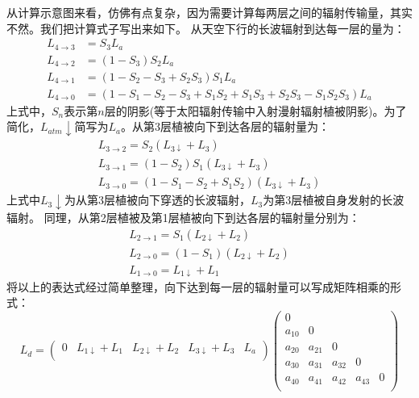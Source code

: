 从计算示意图来看，仿佛有点复杂，因为需要计算每两层之间的辐射传输量，其实不然。我们把计算式子写出来如下。
从天空下行的长波辐射到达每一层的量为：
\begin{equation}
\begin{aligned} L_{4 \rightarrow 3} &=S_{3} L_{a} \\ L_{4 \rightarrow 2} &=\left(1-S_{3}\right) S_{2} L_{a} 
    \\ L_{4 \rightarrow 1} &=\left(1-S_{2}-S_{3}+S_{2} S_{3}\right) S_{1} L_{a} \\ 
    L_{4 \rightarrow 0} &=\left(1-S_{1}-S_{2}-S_{3}+S_{1} S_{2}+S_{1} S_{3}+S_{2} S_{3}-S_{1} S_{2} S_{3}\right) L_{a} \end{aligned}
\end{equation}
上式中，$S_n$表示第$n$层的阴影(等于太阳辐射传输中入射漫射辐射植被阴影)。为了简化，$L_{atm}\downarrow$简写为$L_a$。从第3层植被向下到达各层的辐射量为：
\begin{equation}
\begin{array}{l}L_{3 \rightarrow 2}=S_{2}\left(L_{3 \downarrow}+L_{3}\right) \\
     L_{3 \rightarrow 1}=\left(1-S_{2}\right) S_{1}\left(L_{3 \downarrow}+L_{3}\right) \\
      L_{3 \rightarrow 0}=\left(1-S_{1}-S_{2}+S_{1} S_{2}\right)\left(L_{3 \downarrow}+L_{3}\right)\end{array}
\end{equation}
上式中$L_3\downarrow$为从第3层植被向下穿透的长波辐射，$L_3$为第3层植被自身发射的长波辐射。
同理，从第2层植被及第1层植被向下到达各层的辐射量分别为：
\begin{equation}
\begin{array}{l}L_{2 \rightarrow 1}=S_{1}\left(L_{2 \downarrow}+L_{2}\right) \\ 
    L_{2 \rightarrow 0}=\left(1-S_{1}\right)\left(L_{2 \downarrow}+L_{2}\right) \\
     L_{1 \rightarrow 0}=L_{1 \downarrow}+L_{1}\end{array}
\end{equation}
将以上的表达式经过简单整理，向下达到每一层的辐射量可以写成矩阵相乘的形式：
\begin{equation}
{L}_{d}=\left(\begin{matrix}0&L_{1\downarrow}+L_1&L_{2\downarrow}+L_2&L_{3\downarrow}+L_3&L_a\\
\end{matrix}\right)\left(\begin{matrix}0&&&&\\a_{10}&0&&&\\a_{20}&a_{21}&0&&
    \\a_{30}&a_{31}&a_{32}&0&\\a_{40}&a_{41}&a_{42}&a_{43}&0\\\end{matrix}\right)
\end{equation}

